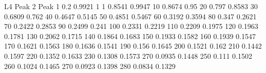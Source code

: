 L4	Peak 2 	Peak 1
0.2	0.9921	1
1	0.8541	0.9947
10	0.8674	0.95
20	0.797	0.8583
30	0.6809	0.762
40	0.4647	0.5145
50	0.4851	0.5467
60	0.3192	0.3594
80	0.347	0.2621
70	0.2422	0.2853
90	0.2499	0.241
100	0.2331	0.2219
110	0.2209	0.1975
120	0.1963	0.1781
130	0.2062	0.1715
140	0.1864	0.1683
150	0.1933	0.1582
160	0.1939	0.1547
170	0.1621	0.1563
180	0.1636	0.1541
190	0.156	0.1645
200	0.1521	0.162
210	0.1442	0.1597
220	0.1352	0.1633
230	0.1308	0.1573
270	0.0935	0.1448
250	0.111	0.1502
260	0.1024	0.1465
270	0.0923	0.1398
280	0.0834	0.1329

